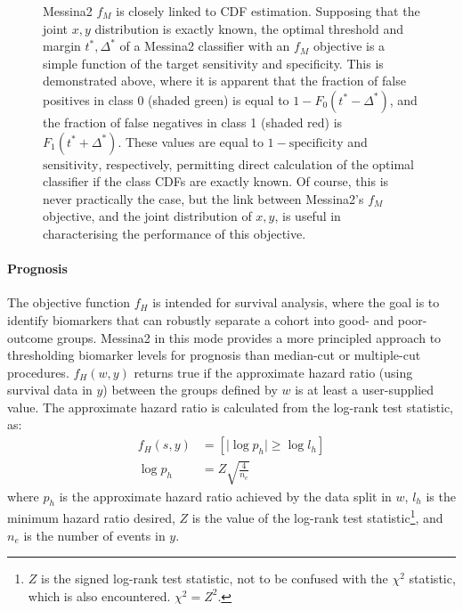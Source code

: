 \documentclass[dissertation.tex]{subfiles}
\begin{document}
\begin{figure}[!htbp]
\centering
\def\svgwidth{\linewidth} 

\caption[Messina2's $f_M$ is closely linked to \texorpdfstring{\acrshort{CDF}}{CDF} estimation]{Messina2 $f_M$ is closely linked to \gls{CDF} estimation.  Supposing that the joint $x, y$ distribution is exactly known, the optimal threshold and margin $t^*, \Delta^*$ of a Messina2 classifier with an $f_M$ objective is a simple function of the target sensitivity and specificity.  This is demonstrated above, where it is apparent that the fraction of false positives in class 0 (shaded green) is equal to $1-F_0(t^*-\Delta^*)$, and the fraction of false negatives in class 1 (shaded red) is $F_1(t^*+\Delta^*)$. These values are equal to $1-\mathrm{specificity}$ and $\mathrm{sensitivity}$, respectively, permitting direct calculation of the optimal classifier if the class \glspl{CDF} are exactly known.  Of course, this is never practically the case, but the link between Messina2's $f_M$ objective, and the joint distribution of $x, y$, is useful in characterising the performance of this objective.}\label{fig:mess-class-cdf-link}
\end{figure}

\paragraph{Prognosis}
The objective function $f_H$ is intended for survival analysis, where the goal is to identify biomarkers that can robustly separate a cohort into good- and poor-outcome groups.  Messina2 in this mode provides a more principled approach to thresholding biomarker levels for prognosis than median-cut or multiple-cut procedures.  $f_H(w, y)$ returns $\mathrm{true}$ if the approximate hazard ratio (using survival data in $y$) between the groups defined by $w$ is at least a user-supplied value.  The approximate hazard ratio is calculated from the log-rank test statistic, as:
\begin{align*}
f_H(s, y) &= \left[ \vert \log{p_h} \vert \geq \log{l_h} \right] \\
\log{p_h} &= Z\sqrt{\frac{4}{n_e}}
\end{align*}
where $p_h$ is the approximate hazard ratio achieved by the data split in $w$, $l_h$ is the minimum hazard ratio desired, $Z$ is the value of the log-rank test statistic\footnote{$Z$ is the signed log-rank test statistic, not to be confused with the $\chi^2$ statistic, which is also encountered.  $\chi^2 = Z^2$.}, and $n_e$ is the number of events in $y$.
\end{document}
